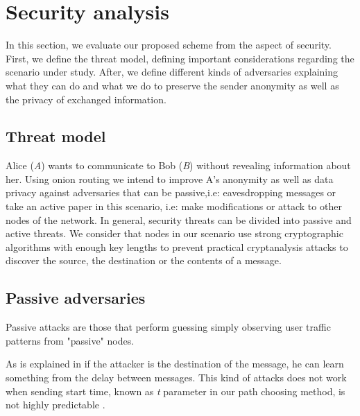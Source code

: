 \section{Security analysis}\label{sec:sanalysis}


In this section, we evaluate our proposed scheme from the aspect of security. First, we define the threat model, defining important considerations regarding the scenario under study. After, we define different kinds of adversaries explaining what they can do and what we do to preserve the sender anonymity as well as the privacy of exchanged information.

\subsection{Threat model}

Alice (\textit{A}) wants to communicate to Bob (\textit{B}) without revealing information about her. Using onion routing we intend to improve A's anonymity as well as data privacy against adversaries that can be passive,i.e: eavesdropping messages or take an active paper in this scenario, i.e: make modifications or attack to other nodes of the network. In general, security threats can be divided into passive and active threats. We consider that nodes in our scenario use strong cryptographic algorithms with enough key lengths to prevent practical cryptanalysis attacks to discover the source, the destination or the contents of a message. 

\subsection{Passive adversaries}

Passive attacks are those that perform guessing simply observing user traffic patterns from "passive" nodes. 

As is explained in \cite{latency-leak} if the attacker is the destination of the message, he can learn something from the delay between messages.  This kind of attacks does not work when sending start time, known as \textit{t} parameter in our path choosing method, is not highly predictable \cite{enpassant}.

